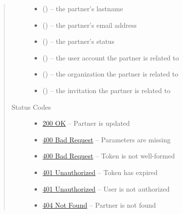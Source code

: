 \documentclass[letterpaper,10pt,english]{sphinxmanual}
\begin{document}
\begin{fulllineitems}
\begin{quote}
\begin{description}
\begin{itemize}
\item {} 
 () -- the partner's lastname

\item {} 
 () -- the partner's email address

\item {} 
 () -- the partner's status

\item {} 
 () -- the user account the partner is related to

\item {} 
 () -- the organization the partner is related to

\item {} 
 () -- the invitation the partner is related to

\end{itemize}

\item[{Status Codes}] \leavevmode\begin{itemize}
\item {} 
\href{http://www.w3.org/Protocols/rfc2616/rfc2616-sec10.html\#sec10.2.1}{200 OK} -- Partner is updated

\item {} 
\href{http://www.w3.org/Protocols/rfc2616/rfc2616-sec10.html\#sec10.4.1}{400 Bad Request} -- Parameters are missing

\item {} 
\href{http://www.w3.org/Protocols/rfc2616/rfc2616-sec10.html\#sec10.4.1}{400 Bad Request} -- Token is not well-formed

\item {} 
\href{http://www.w3.org/Protocols/rfc2616/rfc2616-sec10.html\#sec10.4.2}{401 Unauthorized} -- Token has expired

\item {} 
\href{http://www.w3.org/Protocols/rfc2616/rfc2616-sec10.html\#sec10.4.2}{401 Unauthorized} -- User is not authorized

\item {} 
\href{http://www.w3.org/Protocols/rfc2616/rfc2616-sec10.html\#sec10.4.5}{404 Not Found} -- Partner is not found

\end{itemize}

\end{description}\end{quote}

\end{fulllineitems}
\end{document}
